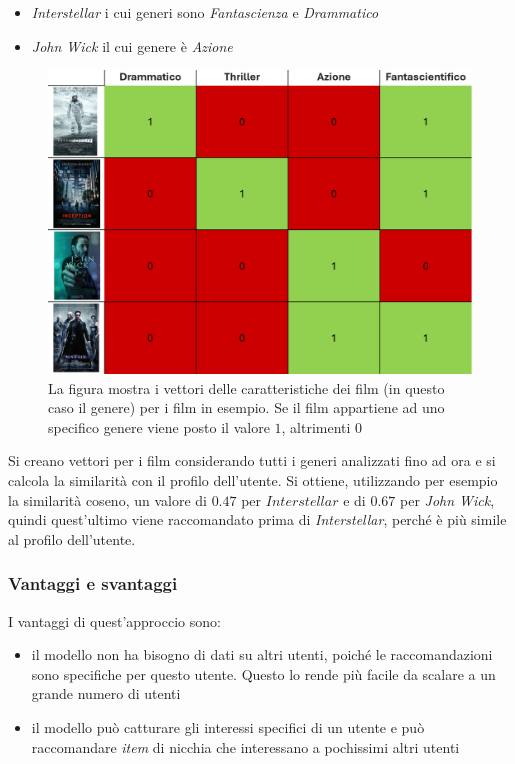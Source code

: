 \begin{itemize}
    \item \textit{Interstellar} i cui generi sono \textit{Fantascienza} e \textit{Drammatico}
    \item \textit{John Wick} il cui genere è \textit{Azione}
\end{itemize}

\begin{figure}[htbp]
    \centering
    \includegraphics[scale=0.5]{figures/content_based_filtering.PNG}
    \caption{La figura mostra i vettori delle caratteristiche dei film (in questo caso il genere) per i film in esempio. Se il film appartiene ad uno specifico genere viene posto il valore $1$, altrimenti $0$}
    \label{fig:item_vector}
\end{figure}

Si creano vettori per i film considerando tutti i generi analizzati fino ad ora e si calcola la similarità con il profilo dell'utente. Si ottiene, utilizzando per esempio la similarità coseno, un valore di $0.47$ per $Interstellar$ e di $0.67$ per \textit{John Wick}, quindi quest'ultimo viene raccomandato prima di \textit{Interstellar}, perché è più simile al profilo dell'utente.

\subsubsection{Vantaggi e svantaggi}

I vantaggi di quest'approccio sono:
\begin{itemize}
    \item il modello non ha bisogno di dati su altri utenti, poiché le raccomandazioni sono specifiche per questo utente. Questo lo rende più facile da scalare a un grande numero di utenti
    \item il modello può catturare gli interessi specifici di un utente e può raccomandare \textit{item} di nicchia che interessano a pochissimi altri utenti
\end{itemize}

